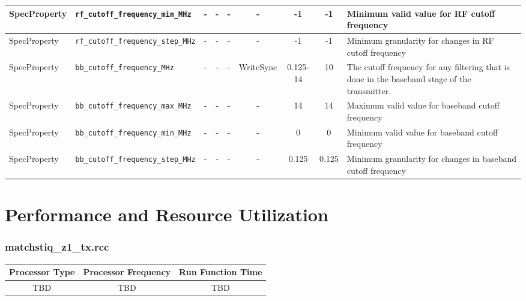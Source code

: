 \documentclass{article}
\def\comp{matchstiq\_z1\_tx}
\begin{document}
\begin{landscape}
\begin{scriptsize}
\begin{tabular}{|p{2cm}|p{4cm}|c|c|c|c|c|c|p{6.5cm}|}
			\hline
			SpecProperty & \verb+rf_cutoff_frequency_min_MHz+  & -    & -        & -          & -              & -1           & -1      & Minimum valid value for RF cutoff frequency                                                   \\
			\hline
			SpecProperty & \verb+rf_cutoff_frequency_step_MHz+ & -    & -        & -          & -              & -1           & -1      & Minimum granularity for changes in RF cutoff frequency                                        \\
			\hline
			SpecProperty & \verb+bb_cutoff_frequency_MHz+      & -    & -        & -          & WriteSync      & 0.125-14     & 10      & The cutoff frequency for any filtering that is done in the baseband stage of the transmitter. \\
			\hline
			SpecProperty & \verb+bb_cutoff_frequency_max_MHz+  & -    & -        & -          & -              & 14           & 14      & Maximum valid value for baseband cutoff frequency                                             \\
			\hline
			SpecProperty & \verb+bb_cutoff_frequency_min_MHz+  & -    & -        & -          & -              & 0            & 0       & Minimum valid value for baseband cutoff frequency                                             \\
			\hline
			SpecProperty & \verb+bb_cutoff_frequency_step_MHz+ & -    & -        & -          & -              & 0.125        & 0.125   & Minimum granularity for changes in baseband cutoff frequency                                  \\
			\hline
		\end{tabular}
	\end{scriptsize}
\end{landscape}

\section*{Performance and Resource Utilization}
\subsubsection*{\comp.rcc}
\begin{scriptsize}
	\begin{tabular}{|c|c|c|}
		\hline
		\rowcolor{blue}
		Processor Type & Processor Frequency & Run Function Time \\
		\hline
		TBD            & TBD                 & TBD               \\
		\hline
	\end{tabular}
\end{scriptsize}
\end{document}
